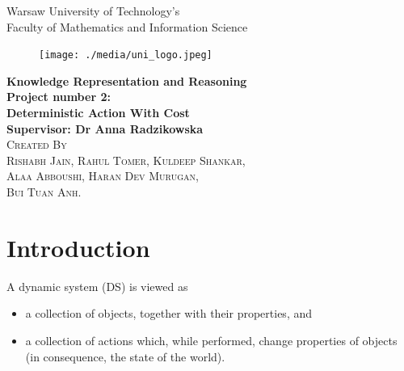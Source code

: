 \documentclass[11pt]{article}
\begin{document}
	\begin{titlepage}
		\begin{center}
			\Large{Warsaw University of Technology's}\\
			\Large{Faculty of Mathematics and Information Science}\\
			[0.3in]
			\begin{figure}[H]
				\centering
				\texttt{[image: ./media/uni\_logo.jpeg]}
				\label{Figure:f04}
			\end{figure}
			\Large{\bfseries Knowledge Representation and Reasoning}\\
			[0.3in]
			\Large{\bfseries Project number 2:}\\
			\Large{\bfseries Deterministic Action With Cost}\\
			\Large{\bfseries Supervisor: Dr Anna Radzikowska}\\
			[0.3in]
			\textsc{\Large{Created By}\\
				Rishabh Jain,
				Rahul Tomer,
				Kuldeep Shankar,\\ 
				Alaa Abboushi,
				Haran Dev Murugan,\\
				Bui Tuan Anh.\\}
		\end{center}	
	\end{titlepage}
	\tableofcontents
	\newpage
	\section{Introduction}\label{sec:intro}
	A dynamic system (DS) is viewed as
	\begin{itemize}
	\item a collection of objects, together with their properties, and
	\item a collection of actions which, while performed, change properties
of objects (in consequence, the state of the world).
	\end{itemize}
\end{document}
